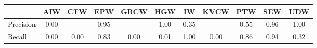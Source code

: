 \begin{tabular}{@{}lcccccccccc@{}}
\toprule
 & AIW & CFW & EPW & GRCW & HGW & IW & KVCW & PTW & SEW & UDW \\
\midrule
Precision & 0.00 & -- & 0.95 & -- & 1.00 & 0.35 & -- & 0.55 & 0.96 & 1.00 \\
Recall & 0.00 & 0.00 & 0.83 & 0.00 & 0.01 & 1.00 & 0.00 & 0.86 & 0.94 & 0.32 \\
\bottomrule
\end{tabular}
